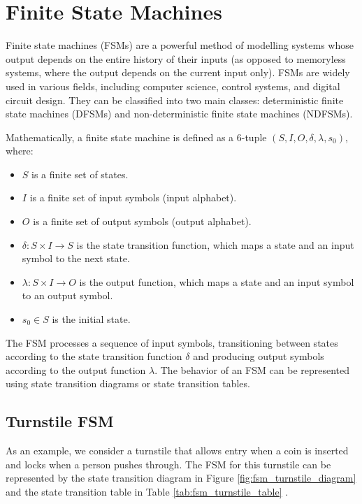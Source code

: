 \section{Finite State Machines}
\label{sec:finite_state_machines}

Finite state machines (FSMs) are a powerful method of modelling systems whose output depends on the entire history of their inputs (as opposed to memoryless systems, where the output depends on the current input only).
FSMs are widely used in various fields, including computer science, control systems, and digital circuit design. They can be classified into two main classes: deterministic finite state machines (DFSMs) and non-deterministic finite state machines (NDFSMs).

Mathematically, a finite state machine is defined as a 6-tuple $(S, I, O, \delta, \lambda, s_0)$, where:

\begin{itemize}
    \item $S$ is a finite set of states.
    \item $I$ is a finite set of input symbols (input alphabet).
    \item $O$ is a finite set of output symbols (output alphabet).
    \item $\delta: S \times I \to S$ is the state transition function, which maps a state and an input symbol to the next state.
    \item $\lambda: S \times I \to O$ is the output function, which maps a state and an input symbol to an output symbol.
    \item $s_0 \in S$ is the initial state.
\end{itemize}

The FSM processes a sequence of input symbols, transitioning between states according to the state transition function $\delta$ and producing output symbols according to the output function $\lambda$.
The behavior of an FSM can be represented using state transition diagrams or state transition tables.



\subsection{Turnstile FSM}
\label{subsec:turnstile_fsm}

As an example, we consider a turnstile that allows entry when a coin is inserted and locks when a person pushes through.
The FSM for this turnstile can be represented by the state transition diagram in Figure \ref{fig:fsm_turnstile_diagram} \cite{wiki:turnstile_fsm} and the state transition table in Table \ref{tab:fsm_turnstile_table} \cite{wiki:turnstile_fsm}.

